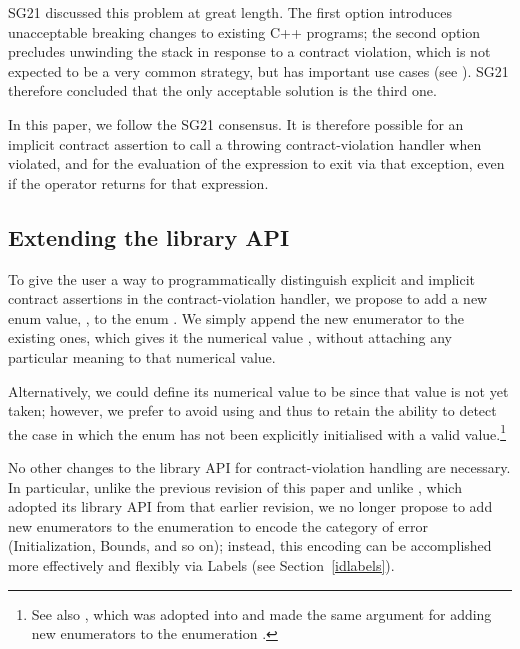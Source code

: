 SG21 discussed this problem at great length. The first option introduces unacceptable breaking changes to existing C++ programs; the second option precludes unwinding the stack in response to a contract violation, which is not expected to be a very common strategy, but has important use cases (see \cite{P3318R0}). SG21 therefore concluded that the only acceptable solution is the third one. 

In this paper, we follow the SG21 consensus. It is therefore possible for an implicit contract assertion to call a throwing contract-violation handler when violated, and for the evaluation of the expression to exit via that exception, even if the  operator returns  for that expression.

\subsection{Extending the library API}
\label{library}

To give the user a way to programmatically distinguish explicit and implicit contract assertions in the contract-violation handler, we propose to add a new enum value, , to the enum \mbox{}. We simply append the new enumerator to the existing ones, which gives it the numerical value , without attaching any particular meaning to that numerical value.

Alternatively, we could define its numerical value to be  since that value is not yet taken; however, we prefer to avoid using  and thus to retain the ability to detect the case in which the enum has not been explicitly initialised with a valid value.\footnote{See also \cite{P3227R0}, which was adopted into \cite{P2900R14} and made the same argument for adding new enumerators to the enumeration .}

No other changes to the library API for contract-violation handling are necessary. In particular, unlike the previous revision of this paper and unlike \cite{P3081R1}, which adopted its library API from that earlier revision, we no longer propose to add new enumerators to the enumeration \mbox{} to encode the category of error (Initialization, Bounds, and so on); instead, this encoding can be accomplished more effectively and flexibly via Labels (see Section~\ref{idlabels}).

